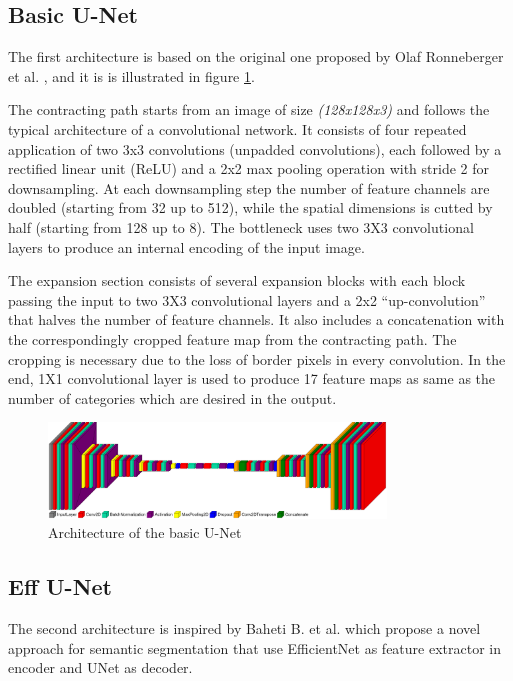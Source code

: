 \documentclass[a4paper,10pt]{report}
\begin{document}
\subsection{Basic U-Net}\label{subsec:subsection-411}
The first architecture is based on the original one proposed by Olaf Ronneberger et al. \cite{unet}, and it is is illustrated in figure \ref{fig:basic-unet}. 

The contracting path starts from an image of size \emph{(128x128x3)} and follows the typical architecture of a convolutional network. It consists of four repeated application of two 3x3 convolutions (unpadded convolutions), each followed by a rectified linear unit (ReLU) and a 2x2 max pooling operation with stride 2 for downsampling. 
At each downsampling step the number of feature
channels are doubled (starting from 32 up to 512), while the spatial dimensions is cutted by half (starting from 128 up to 8). The bottleneck uses two 3X3 convolutional layers to produce an internal encoding of the input image. 

The expansion section consists of several expansion blocks with each block passing the input to two 3X3 convolutional layers and a 2x2 “up-convolution” that halves the number of feature channels. It also includes a concatenation with the correspondingly cropped feature map from the contracting path. The cropping is necessary due to the loss of border pixels in
every convolution. In the end, 1X1 convolutional layer is used to produce 17 feature maps as same as the number of categories which are desired in the output.

\begin{figure}[h]
    \centering
    \includegraphics[width=0.8\textwidth]{assets/img/unet.png}
    \caption{Architecture of the basic U-Net}
    \label{fig:basic-unet}
\end{figure}

\subsection{Eff U-Net}\label{subsec:subsection-412}
The second architecture is inspired by Baheti B. et al. \cite{effunet} which propose a novel approach for semantic segmentation that use EfficientNet as feature extractor in encoder and UNet as decoder. 
\end{document}
